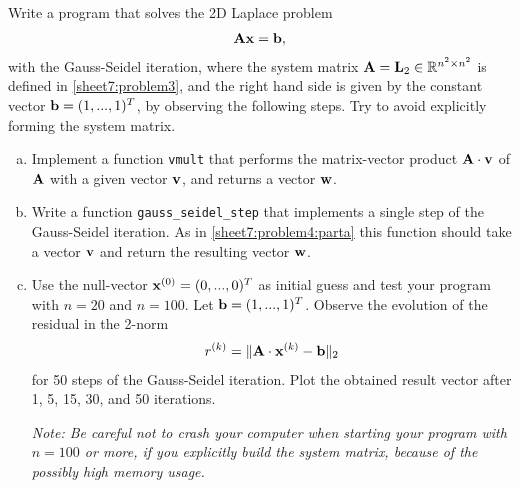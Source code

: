 \begin{Sheet}
  \begin{Problem}[Programming]
    \label{sheet7:problem4}
    Write a program that solves the 2D Laplace problem
    \begin{gather*}
      \mathbf A\mathbf x=\mathbf b,
    \end{gather*}
    with the Gauss-Seidel iteration, where the system matrix
    $\mathbf A=\mathbf L_2\in\mathbb R^{n^2\times n^2}$ is defined in
    \cref{sheet7:problem3}, and the right hand side is given by the
    constant vector $\mathbf b=(1,...,1)^T$, by observing the following
    steps. Try to avoid explicitly forming the system matrix.
    \begin{enumerate}[(a)]
    \item\label{sheet7:problem4:parta} Implement a function
      \lstinline{vmult} that performs the matrix-vector product
      $\mathbf A\cdot\mathbf v$ of $\mathbf A$ with a given vector $\mathbf v$, and
      returns a vector $\mathbf w$.
    \item Write a function \lstinline{gauss_seidel_step} that
      implements a single step of the Gauss-Seidel iteration. As in
      \eqref{sheet7:problem4:parta} this function should take a vector
      $\mathbf v$ and return the resulting vector $\mathbf w$.
    \item Use the null-vector $\mathbf x^{(0)} = (0,...,0)^T$ as initial
      guess and test your program with $n=20$ and $n=100$.
      Let $\mathbf b=(1,...,1)^T$. Observe the
      evolution of the residual in the 2-norm
      \begin{gather*}
        r^{(k)} = \lVert\mathbf A\cdot\mathbf x^{(k)}-\mathbf b\rVert_2
      \end{gather*}
      for 50 steps of the Gauss-Seidel iteration.  Plot the obtained
      result vector after 1, 5, 15, 30, and 50 iterations.

      \textit{Note: Be careful not to crash your computer when
        starting your program with $n=100$ or more, if you explicitly
        build the system matrix, because of the possibly high memory
        usage.}
    \end{enumerate}
  \end{Problem}

\end{Sheet}


